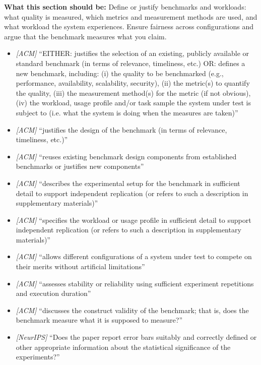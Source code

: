 \noindent\textbf{What this section should be:}
Define or justify benchmarks and workloads: what quality is measured, which metrics and measurement methods are used, and what workload the system experiences. Ensure fairness across configurations and argue that the benchmark measures what you claim.
\begin{itemize}
  \item \textit{[ACM]} ``EITHER: justifies the selection of an existing, publicly available or standard benchmark (in terms of relevance, timeliness, etc.) OR: defines a new benchmark, including: (i) the quality to be benchmarked (e.g., performance, availability, scalability, security), (ii) the metric(s) to quantify the quality, (iii) the measurement method(s) for the metric (if not obvious), (iv) the workload, usage profile and/or task sample the system under test is subject to (i.e. what the system is doing when the measures are taken)''
  \item \textit{[ACM]} ``justifies the design of the benchmark (in terms of relevance, timeliness, etc.)''
  \item \textit{[ACM]} ``reuses existing benchmark design components from established benchmarks or justifies new components''
  \item \textit{[ACM]} ``describes the experimental setup for the benchmark in sufficient detail to support independent replication (or refers to such a description in supplementary materials)''
  \item \textit{[ACM]} ``specifies the workload or usage profile in sufficient detail to support independent replication (or refers to such a description in supplementary materials)''
  \item \textit{[ACM]} ``allows different configurations of a system under test to compete on their merits without artificial limitations''
  \item \textit{[ACM]} ``assesses stability or reliability using sufficient experiment repetitions and execution duration''
  \item \textit{[ACM]} ``discusses the construct validity of the benchmark; that is, does the benchmark measure what it is supposed to measure?''
  \item \textit{[NeurIPS]} ``Does the paper report error bars suitably and correctly defined or other appropriate information about the statistical significance of the experiments?''
\end{itemize}
